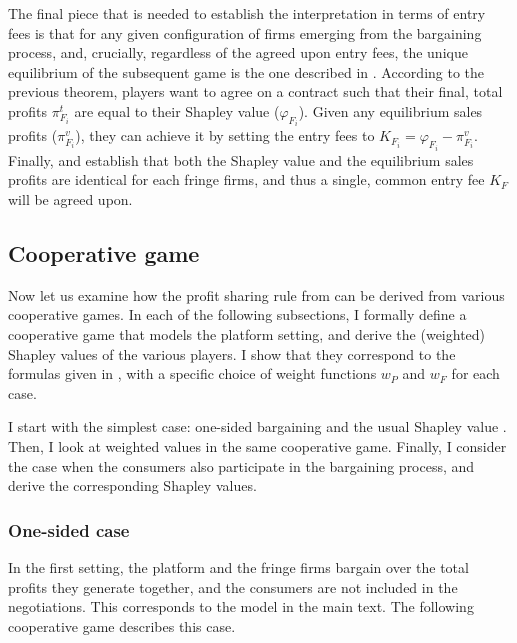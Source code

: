 \documentclass[a4paper]{article}
\begin{document}
The final piece that is needed to establish the interpretation in terms of entry fees is that for any given configuration of firms emerging from the bargaining process, and, crucially, regardless of the agreed upon entry fees, the unique equilibrium of the subsequent game is the one described in .
According to the previous theorem, players want to agree on a contract such that their final, total profits $\pi^t_{F_i}$ are equal to their Shapley value ($\varphi_{F_i}$).
Given any equilibrium sales profits ($\pi^v_{F_i}$), they can achieve it by setting the entry fees to $K_{F_i} = \varphi_{F_i} - \pi^v_{F_i}$.
Finally,  and  establish that both the Shapley value and the equilibrium sales profits are identical for each fringe firms, and thus a single, common entry fee $K_F$ will be agreed upon.

\subsection{Cooperative game}
\label{sec:cooperative_game}

Now let us examine how the profit sharing rule from  can be derived from various cooperative games.
In each of the following subsections, I formally define a cooperative game that models the platform setting, and derive the (weighted) Shapley values of the various players.
I show that they correspond to the formulas given in , with a specific choice of weight functions $w_P$ and $w_F$ for each case.

I start with the simplest case: one-sided bargaining and the usual Shapley value \parencite{shapley1953additive}.
Then, I look at weighted values \parencite{weber1988probabilistic} in the same cooperative game.
Finally, I consider the case when the consumers also participate in the bargaining process, and derive the corresponding Shapley values.

\subsubsection{One-sided case}
\label{sec:cooperative_game_one_sided}

In the first setting, the platform and the fringe firms bargain over the total profits they generate together, and the consumers are not included in the negotiations.
This corresponds to the model in the main text.
The following cooperative game describes this case.
\end{document}
